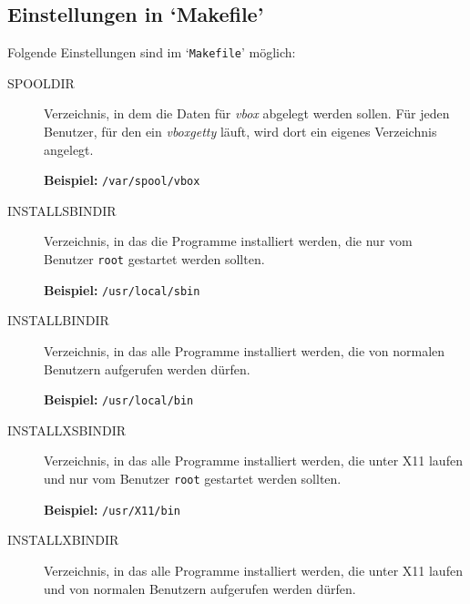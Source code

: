 \subsection{Einstellungen in `Makefile'\label{id-install-makefile}}



Folgende Einstellungen sind im `{\tt Makefile}' m\"{o}glich:

\begin{description}


\item[SPOOLDIR] \mbox{}



Verzeichnis, in dem die Daten f\"{u}r {\em vbox\/} abgelegt werden sollen.
F\"{u}r jeden Benutzer, f\"{u}r den ein {\em vboxgetty\/} l\"{a}uft, wird dort ein
eigenes Verzeichnis angelegt.

{\bf Beispiel:} {\tt /var/spool/vbox}



\item[INSTALLSBINDIR] \mbox{}



Verzeichnis, in das die Programme installiert werden, die nur vom Benutzer
{\tt root} gestartet werden sollten.

{\bf Beispiel:} {\tt /usr/local/sbin}



\item[INSTALLBINDIR] \mbox{}



Verzeichnis, in das alle Programme installiert werden, die von normalen
Benutzern aufgerufen werden d\"{u}rfen.

{\bf Beispiel:} {\tt /usr/local/bin}



\item[INSTALLXSBINDIR] \mbox{}



Verzeichnis, in das alle Programme installiert werden, die unter X11 laufen
und nur vom Benutzer {\tt root} gestartet werden sollten.

{\bf Beispiel:} {\tt /usr/X11/bin}



\item[INSTALLXBINDIR] \mbox{}



Verzeichnis, in das alle Programme installiert werden, die unter X11 laufen
und von normalen Benutzern aufgerufen werden d\"{u}rfen.


\end{description}
